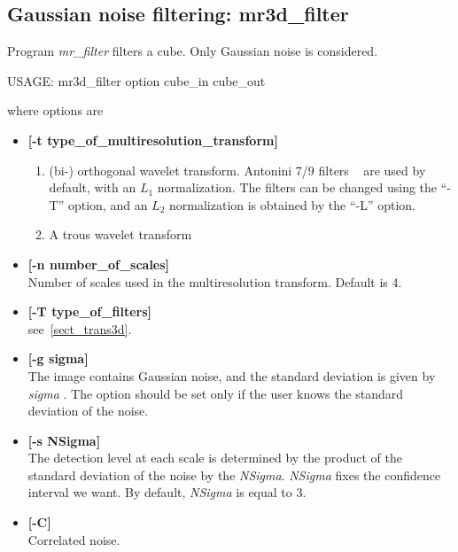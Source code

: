 \subsection{Gaussian noise filtering: mr3d\_filter}
Program {\em mr\_filter} filters a cube. Only Gaussian noise 
is considered.
{\bf
\begin{center}
 USAGE: mr3d\_filter option cube\_in cube\_out
\end{center}}
where options are 
\begin{itemize}
\baselineskip=0.4truecm
\itemsep=0.1truecm
\item {\bf [-t type\_of\_multiresolution\_transform]}
{\small 
\begin{enumerate}
\item  (bi-) orthogonal wavelet transform.  
Antonini 7/9 filters ~\cite{wave:antonini92} are used by default, with an 
$L_1$ normalization. The filters can be changed using the ``-T'' option, and
an $L_2$ normalization is obtained by the ``-L'' option.
\item A trous wavelet transform
\end{enumerate}}
\item {\bf [-n number\_of\_scales]} \\
Number of scales used in the multiresolution transform. Default is 4.
\item {\bf [-T type\_of\_filters]}  \\
see~\ref{sect_trans3d}.
\item {\bf [-g sigma]} \\
 The image contains Gaussian noise, and the standard deviation is
given by {\em sigma }. The option should be set only if the user
knows the standard deviation of the noise. 
\item {\bf [-s NSigma]} \\
The detection level at each scale is determined by the product
of the standard deviation of the noise by the {\em NSigma}.
{\em NSigma} fixes the confidence interval we want. By default,
{\em NSigma} is equal to 3.
\item {\bf [-C]} \\
Correlated noise.
\end{itemize}
